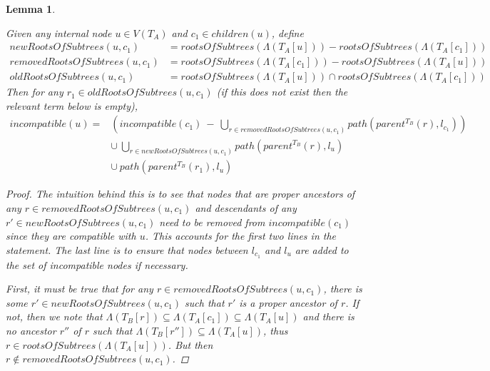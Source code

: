 \documentclass{article}
\newcommand{\leafset}{\Lambda}
\newtheorem{incompatibilityrecursive}[incompatibility]{Lemma}
\begin{document}
    \begin{incompatibilityrecursive}
        \label{lem:incompatibilityrecursive}

        Given any internal node $u \in V(T_A)$ and $c_1 \in children(u)$, define
        \begin{align*}
            newRootsOfSubtrees(u, c_1) &= rootsOfSubtrees(\leafset(T_A[u])) - rootsOfSubtrees(\leafset(T_A[c_1]))\\[0.5em]
            removedRootsOfSubtrees(u, c_1) &= rootsOfSubtrees(\leafset(T_A[c_1])) - rootsOfSubtrees(\leafset(T_A[u]))\\[0.5em]
            oldRootsOfSubtrees(u, c_1) &= rootsOfSubtrees(\leafset(T_A[u])) \cap rootsOfSubtrees(\leafset(T_A[c_1]))
        \end{align*}
        Then for any $r_1 \in oldRootsOfSubtrees(u, c_1)$ (if this does not exist then the relevant term below is empty),
        \begin{align*}
            incompatible(u) = &\left(incompatible(c_1)\ -\ \bigcup_{r \in removedRootsOfSubtrees(u, c_1)} path(parent^{T_B}(r), l_{c_1})\right)\\
            &\cup\ \bigcup_{r \in newRootsOfSubtrees(u, c_1)} path(parent^{T_B}(r), l_u)\\
            &\cup\ path(parent^{T_B}(r_1), l_u)
        \end{align*}

        \begin{proof}
            The intuition behind this is to see that nodes that are proper ancestors of any $r \in removedRootsOfSubtrees(u, c_1)$ and descendants of any $r' \in newRootsOfSubtrees(u, c_1)$ need to be removed from $incompatible(c_1)$ since they are compatible with $u$. This accounts for the first two lines in the statement. The last line is to ensure that nodes between $l_{c_1}$ and $l_u$ are added to the set of incompatible nodes if necessary.

            First, it must be true that for any $r \in removedRootsOfSubtrees(u, c_1)$, there is some $r' \in newRootsOfSubtrees(u, c_1)$ such that $r'$ is a proper ancestor of $r$. If not, then we note that $\leafset(T_B[r]) \subseteq \leafset(T_A[c_1]) \subseteq \leafset(T_A[u])$ and there is no ancestor $r''$ of $r$ such that $\leafset(T_B[r'']) \subseteq \leafset(T_A[u])$, thus $r \in rootsOfSubtrees(\leafset(T_A[u]))$. But then $r \not\in removedRootsOfSubtrees(u, c_1)$.


\end{proof}
\end{incompatibilityrecursive}
\end{document}
